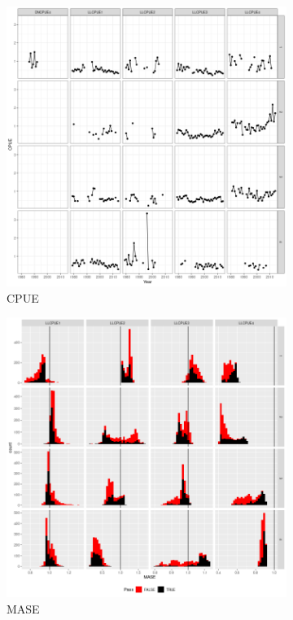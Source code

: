 \begin{figure}
        \begin{subfigure}[b]{0.5\textwidth}
           \includegraphics[width=\linewidth]{figures/cpue.png}
                \caption{CPUE}
                \label{fig:mase-u}
        \end{subfigure}%
                \begin{subfigure}[b]{0.5\textwidth} \includegraphics[width=\linewidth]{figures/mase-1.png}
                \caption{MASE}
                \label{fig:mase-score}
        \end{subfigure}%
        \caption{}\label{fig:mase}
\end{figure}
\fi


